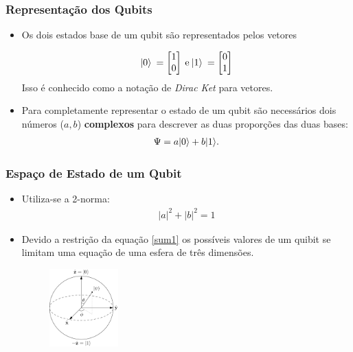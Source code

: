 \documentclass{beamer}
\DeclarePairedDelimiter\ket{\lvert}{\rangle}
\begin{document}
\begin{frame}
\frametitle{Representação dos Qubits}
\begin{itemize}
  \item Os dois estados base de um qubit são representados pelos vetores

\begin{align}
\label{vet}
  \ket{0} \: = \begin{bmatrix} 
          1 \\ 
          0 \\ 
        \end{bmatrix}
  \:\text{e}\:
  \ket{1} \: = \begin{bmatrix} 
          0 \\ 
          1 \\ 
        \end{bmatrix}
\end{align}
Isso é conhecido como a notação de \textit{Dirac Ket} para vetores.
\item Para completamente representar o estado de um qubit são
  necessários dois números ($a, b$) \textbf{complexos} para descrever
  as duas proporções das duas bases:
\begin{align}
\label{amp}
  \Psi = a \ket{0} + b \ket{1}.
\end{align}
\end{itemize}
\end{frame}

\begin{frame}
\frametitle{Espaço de Estado de um Qubit}
\begin{itemize}
\item Utiliza-se a 2-norma:
  \begin{align}
    \label{sum1}
      |a|^2 + |b|^2 = 1
  \end{align}
\item Devido a restrição da equação \ref{sum1} os possíveis valores de um
  quibit se limitam uma equação de uma esfera de três dimensões.
\begin{figure}[h]
\label{bloch}
\centering
\includegraphics[width=0.25\textwidth]{bloch.png}
\end{figure}
\end{itemize}
\end{frame}
\end{document}
